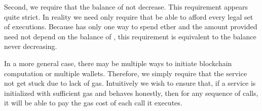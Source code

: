 Second, we require that the balance of \tcadd not decrease.
This requirement appears quite strict.
In reality we need only require that \tc be able to afford every legal set of executions.
Because \tc has only one way to spend ether and the amount provided need not depend on the balance of \tcadd,
this requirement is equivalent to the balance never decreasing.

In a more general case, there may be multiple ways to initiate blockchain computation or multiple wallets.
Therefore, we simply require that the service not get stuck due to lack of gas.
Intuitively we wish to ensure that, if a service is initialized with sufficient gas and behaves honestly,
then for any sequence of calls, it will be able to pay the gas cost of each call it executes.



